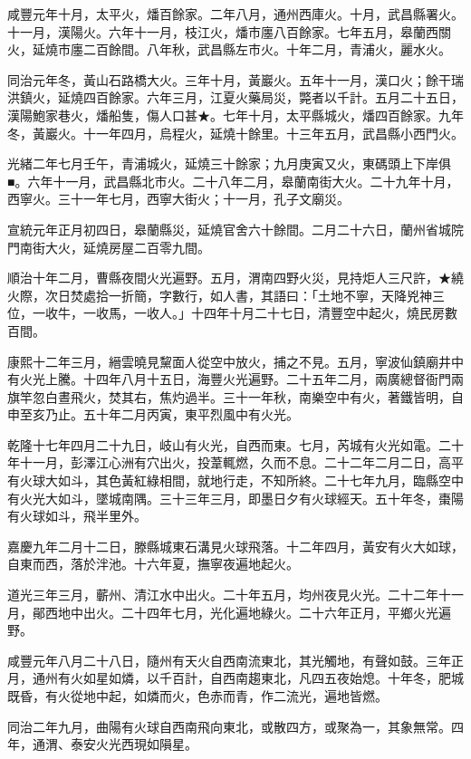 \begin{pinyinscope}
咸豐元年十月，太平火，燔百餘家。二年八月，通州西庫火。十月，武昌縣署火。十一月，漢陽火。六年十一月，枝江火，燔市廛八百餘家。七年五月，皋蘭西關火，延燒市廛二百餘間。八年秋，武昌縣左市火。十年二月，青浦火，麗水火。

同治元年冬，黃山石路橋大火。三年十月，黃巖火。五年十一月，漢口火；餘干瑞洪鎮火，延燒四百餘家。六年三月，江夏火藥局災，斃者以千計。五月二十五日，漢陽鮑家巷火，燔船隻，傷人口甚★。七年十月，太平縣城火，燔四百餘家。九年冬，黃巖火。十一年四月，烏程火，延燒十餘里。十三年五月，武昌縣小西門火。

光緒二年七月壬午，青浦城火，延燒三十餘家；九月庚寅又火，東碼頭上下岸俱■。六年十一月，武昌縣北市火。二十八年二月，皋蘭南街大火。二十九年十月，西寧火。三十一年七月，西寧大街火；十一月，孔子文廟災。

宣統元年正月初四日，皋蘭縣災，延燒官舍六十餘間。二月二十六日，蘭州省城院門南街大火，延燒房屋二百零九間。

順治十年二月，曹縣夜間火光遍野。五月，渭南四野火災，見持炬人三尺許，★繞火際，次日焚處拾一折簡，字數行，如人書，其語曰：「土地不寧，天降兇神三位，一收牛，一收馬，一收人。」十四年十月二十七日，清豐空中起火，燒民房數百間。

康熙十二年三月，縉雲曉見黧面人從空中放火，捕之不見。五月，寧波仙鎮廟井中有火光上騰。十四年八月十五日，海豐火光遍野。二十五年二月，兩廣總督衙門兩旗竿忽白晝飛火，焚其右，焦灼過半。三十一年秋，南樂空中有火，著鐵皆明，自申至亥乃止。五十年二月丙寅，東平烈風中有火光。

乾隆十七年四月二十九日，岐山有火光，自西而東。七月，芮城有火光如電。二十年十一月，彭澤江心洲有穴出火，投葦輒燃，久而不息。二十二年二月二日，高平有火球大如斗，其色黃紅綠相間，就地行走，不知所終。二十七年九月，臨縣空中有火光大如斗，墜城南隅。三十三年三月，即墨日夕有火球經天。五十年冬，棗陽有火球如斗，飛半里外。

嘉慶九年二月十二日，滕縣城東石溝見火球飛落。十二年四月，黃安有火大如球，自東而西，落於泮池。十六年夏，撫寧夜遍地起火。

道光三年三月，蘄州、清江水中出火。二十年五月，均州夜見火光。二十二年十一月，鄖西地中出火。二十四年七月，光化遍地綠火。二十六年正月，平鄉火光遍野。

咸豐元年八月二十八日，隨州有天火自西南流東北，其光觸地，有聲如鼓。三年正月，通州有火如星如燐，以千百計，自西南趨東北，凡四五夜始熄。十年冬，肥城既昏，有火從地中起，如燐而火，色赤而青，作二流光，遍地皆燃。

同治二年九月，曲陽有火球自西南飛向東北，或散四方，或聚為一，其象無常。四年，通渭、泰安火光西現如隕星。


\end{pinyinscope}
